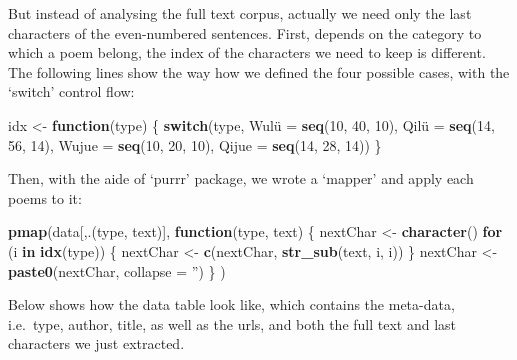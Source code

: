 \documentclass[]{article}
\newenvironment{Shaded}{\begin{snugshade}}{\end{snugshade}}
\newcommand{\ControlFlowTok}[1]{\textcolor[rgb]{0.13,0.29,0.53}{\textbf{#1}}}
\newcommand{\DataTypeTok}[1]{\textcolor[rgb]{0.13,0.29,0.53}{#1}}
\newcommand{\DecValTok}[1]{\textcolor[rgb]{0.00,0.00,0.81}{#1}}
\newcommand{\KeywordTok}[1]{\textcolor[rgb]{0.13,0.29,0.53}{\textbf{#1}}}
\newcommand{\NormalTok}[1]{#1}
\newcommand{\StringTok}[1]{\textcolor[rgb]{0.31,0.60,0.02}{#1}}
\begin{document}
But instead of analysing the full text corpus, actually we need only the
last characters of the even-numbered sentences. First, depends on the
category to which a poem belong, the index of the characters we need to
keep is different. The following lines show the way how we defined the
four possible cases, with the `switch' control flow:

\begin{Shaded}
\begin{Highlighting}[]
\NormalTok{idx <-}\StringTok{ }\ControlFlowTok{function}\NormalTok{(type) \{}
    \ControlFlowTok{switch}\NormalTok{(type,}
\NormalTok{           Wulü  =}\StringTok{ }\KeywordTok{seq}\NormalTok{(}\DecValTok{10}\NormalTok{, }\DecValTok{40}\NormalTok{, }\DecValTok{10}\NormalTok{),}
\NormalTok{           Qilü  =}\StringTok{ }\KeywordTok{seq}\NormalTok{(}\DecValTok{14}\NormalTok{, }\DecValTok{56}\NormalTok{, }\DecValTok{14}\NormalTok{),}
           \DataTypeTok{Wujue =} \KeywordTok{seq}\NormalTok{(}\DecValTok{10}\NormalTok{, }\DecValTok{20}\NormalTok{, }\DecValTok{10}\NormalTok{),}
           \DataTypeTok{Qijue =} \KeywordTok{seq}\NormalTok{(}\DecValTok{14}\NormalTok{, }\DecValTok{28}\NormalTok{, }\DecValTok{14}\NormalTok{))}
\NormalTok{  \}}
\end{Highlighting}
\end{Shaded}

Then, with the aide of `purrr' package, we wrote a `mapper' and apply
each poems to it:

\begin{Shaded}
\begin{Highlighting}[]
\KeywordTok{pmap}\NormalTok{(data[,.(type, text)],}
       \ControlFlowTok{function}\NormalTok{(type, text) \{}
\NormalTok{         nextChar <-}\StringTok{ }\KeywordTok{character}\NormalTok{()}
         \ControlFlowTok{for}\NormalTok{ (i }\ControlFlowTok{in} \KeywordTok{idx}\NormalTok{(type)) \{}
\NormalTok{           nextChar <-}\StringTok{ }\KeywordTok{c}\NormalTok{(nextChar, }\KeywordTok{str_sub}\NormalTok{(text, i, i))}
\NormalTok{         \}}
\NormalTok{         nextChar <-}\StringTok{ }\KeywordTok{paste0}\NormalTok{(nextChar, }\DataTypeTok{collapse =} \StringTok{''}\NormalTok{)}
\NormalTok{       \}}
\NormalTok{  )}
\end{Highlighting}
\end{Shaded}

Below shows how the data table look like, which contains the meta-data,
i.e.~type, author, title, as well as the urls, and both the full text
and last characters we just extracted.
\end{document}
